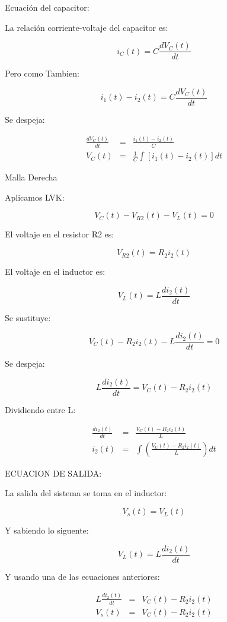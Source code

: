 \documentclass{article}
\begin{document}
Ecuaci\'{o}n del capacitor: 

La relaci\'{o}n corriente-voltaje del capacitor es: 

\bigskip 
\[
i_{C}(t)=C\frac{dV_{C}(t)}{dt}
\]

Pero como Tambien:

\[
i_{1}(t)-i_{2}(t)=C\frac{dV_{C}(t)}{dt}
\]

Se despeja:

\begin{eqnarray*}
\frac{dV_{C}(t)}{dt} &=&\frac{i_{1}(t)-i_{2}(t)}{C} \\
V_{C}(t) &=&\frac{1}{C}\int [i_{1}(t)-i_{2}(t)]dt
\end{eqnarray*}

Malla Derecha

Aplicamos LVK:

\[
V_{C}(t)-V_{R2}(t)-V_{L}(t)=0
\]

El voltaje en el resistor R2 es: 

\[
V_{R2}(t)=R_{2}i_{2}(t)
\]

El voltaje en el inductor es: 

\bigskip 
\[
V_{L}(t)=L\frac{di_{2}(t)}{dt}
\]

Se sustituye:

\bigskip 
\[
V_{C}(t)-R_{2}i_{2}(t)-L\frac{di_{2}(t)}{dt}=0
\]

Se despeja:

\bigskip 
\[
L\frac{di_{2}(t)}{dt}=V_{C}(t)-R_{2}i_{2}(t)
\]

Dividiendo entre L: 

\begin{eqnarray*}
\frac{di_{2}(t)}{dt} &=&\frac{V_{C}(t)-R_{2}i_{2}(t)}{L} \\
i_{2}(t) &=&\int \left( \frac{V_{C}(t)-R_{2}i_{2}(t)}{L}\right) dt
\end{eqnarray*}

\bigskip ECUACION DE SALIDA:

La salida del sistema se toma en el inductor:

\[
V_{s}(t)=V_{L}(t)
\]

\bigskip Y sabiendo lo siguente:

\[
V_{L}(t)=L\frac{di_{2}(t)}{dt}
\]

Y usando una de las ecuaciones anteriores:

\begin{eqnarray*}
L\frac{di_{2}(t)}{dt} &=&V_{C}(t)-R_{2}i_{2}(t) \\
V_{s}(t) &=&V_{C}(t)-R_{2}i_{2}(t)
\end{eqnarray*}
\end{document}
